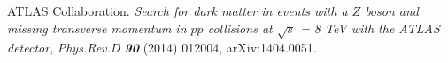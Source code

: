 %
%

ATLAS Collaboration. \emph{Search for dark matter in events with a $Z$ boson and missing transverse momentum in $pp$ collisions at $\sqrt{s}$ = 8 TeV with the ATLAS detector}, \emph{Phys.Rev.D \textbf{90}} (2014) 012004, arXiv:1404.0051.


%
%
%
%
%

